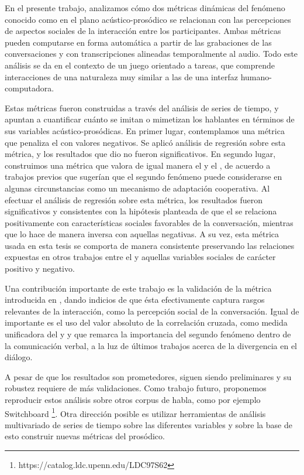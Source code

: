En el presente trabajo, analizamos cómo dos métricas dinámicas del fenómeno conocido como \entrainment en el plano acústico-prosódico se relacionan con las percepciones de aspectos sociales de la interacción entre los participantes. Ambas métricas pueden computarse en forma automática a partir de las grabaciones de las conversaciones y con transcripciones  alineadas temporalmente al audio. Todo este análisis se da en el contexto de un juego orientado a tareas, que comprende interacciones de una naturaleza muy similar a las de una interfaz humano-computadora.

Estas métricas fueron construidas a través del análisis de series de tiempo, y apuntan a cuantificar cuánto se imitan o mimetizan los hablantes en términos de sus variables acústico-prosódicas. En primer lugar, contemplamos una métrica que penaliza el \disentrainment con valores negativos. Se aplicó análisis de regresión sobre esta métrica, y los resultados que dio no fueron significativos. En segundo lugar, construimos una métrica que valora de igual manera el \entrainment y el \disentrainment, de acuerdo a trabajos previos que sugerían que el segundo fenómeno puede considerarse en algunas circunstancias como un mecanismo de adaptación cooperativa. Al efectuar el análisis de regresión sobre esta métrica, los resultados fueron significativos y consistentes con la hipótesis planteada de que el \entrainment se relaciona positivamente con características sociales favorables de la conversación, mientras que lo hace de manera inversa con aquellas negativas. A su vez, esta métrica usada en esta tesis se comporta de manera consistente preservando las relaciones expuestas en otros trabajos entre el \entrainment y aquellas variables sociales de carácter positivo y negativo. 

Una contribución importante de este trabajo es la validación de la métrica introducida en \cite{KOU2008.2}, dando indicios de que ésta efectivamente captura rasgos relevantes de la interacción, como la percepción social de la conversación. Igual de importante es el uso del valor absoluto de la correlación cruzada, como medida unificadora del \entrainment y \disentrainment y que remarca la importancia del segundo fenómeno dentro de la comunicación verbal, a la luz de últimos trabajos acerca de la divergencia en el diálogo.

A pesar de que los resultados son prometedores, siguen siendo preliminares y su robustez requiere de más validaciones. Como trabajo futuro, proponemos reproducir estos análisis sobre otros corpus de habla, como por ejemplo Switchboard \footnote{https://catalog.ldc.upenn.edu/LDC97S62}. Otra dirección posible es utilizar herramientas de análisis multivariado de series de tiempo sobre las diferentes variables \ap y sobre la base de esto construir nuevas métricas del \entrainment prosódico.
